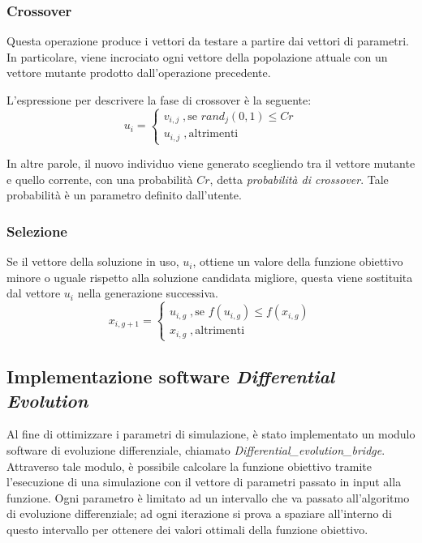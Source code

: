 \subsubsection{Crossover}

Questa operazione produce i vettori da testare a partire dai vettori di parametri.
In particolare, viene incrociato ogni vettore della popolazione attuale con un vettore mutante prodotto dall'operazione precedente.

L'espressione per descrivere la fase di crossover è la seguente:
\begin{equation*}
    u_{i} = \begin{cases}
        v_{i,j} \; , \text{se } rand_{j}(0,1) \leq Cr \\
        u_{i,j} \; , \text{altrimenti} 
    \end{cases}
\end{equation*}

In altre parole, il nuovo individuo viene generato scegliendo tra il vettore mutante e quello corrente, con una probabilità $Cr$, detta \textit{probabilità di crossover}.
Tale probabilità è un parametro definito dall'utente.

\subsubsection{Selezione}

Se il vettore della soluzione in uso, $u_{i}$, ottiene un valore della funzione obiettivo minore o uguale rispetto alla soluzione candidata migliore, questa viene sostituita dal vettore $u_{i}$ nella generazione successiva.
\begin{equation*}
    x_{i,g+1} = \begin{cases}
        u_{i,g} \; , \text{se } f(u_{i,g}) \leq f(x_{i,g}) \\
        x_{i,g} \; , \text{altrimenti} 
    \end{cases}
\end{equation*}

\subsection{Implementazione software \textit{Differential Evolution}}

Al fine di ottimizzare i parametri di simulazione, è stato implementato un modulo software di evoluzione differenziale, chiamato \textit{Differential\_evolution\_bridge}.
Attraverso tale modulo, è possibile calcolare la funzione obiettivo tramite l'esecuzione di una simulazione con il vettore di parametri passato in input alla funzione.
Ogni parametro è limitato ad un intervallo che va passato all'algoritmo di evoluzione differenziale; ad ogni iterazione si prova a spaziare all'interno di questo intervallo per ottenere dei valori ottimali della funzione obiettivo.

